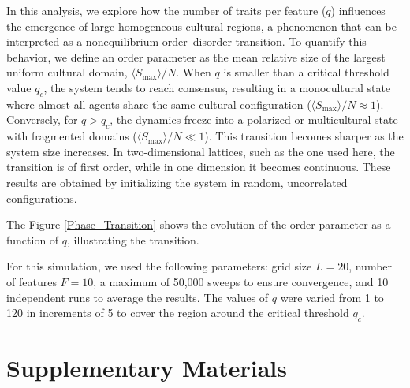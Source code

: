 In this analysis, we explore how the number of traits per feature ($q$) influences the emergence of large homogeneous cultural regions, a phenomenon that can be interpreted as a nonequilibrium order--disorder transition. To quantify this behavior, we define an order parameter as the mean relative size of the largest uniform cultural domain, $\langle S_{\max}\rangle/N$. When $q$ is smaller than a critical threshold value $q_c$, the system tends to reach consensus, resulting in a monocultural state where almost all agents share the same cultural configuration ($\langle S_{\max}\rangle/N \approx 1$). Conversely, for $q > q_c$, the dynamics freeze into a polarized or multicultural state with fragmented domains ($\langle S_{\max}\rangle/N \ll 1$). This transition becomes sharper as the system size increases. In two-dimensional lattices, such as the one used here, the transition is of first order, while in one dimension it becomes continuous. These results are obtained by initializing the system in random, uncorrelated configurations.

The Figure \ref{Phase_Transition} shows the evolution of the order parameter as a function of $q$, illustrating the transition.


For this simulation, we used the following parameters: grid size $L=20$, number of features $F=10$, a maximum of 50,000 sweeps to ensure convergence, and 10 independent runs to average the results. The values of $q$ were varied from 1 to 120 in increments of 5 to cover the region around the critical threshold $q_c$.


\newpage
\section*{Supplementary Materials}

